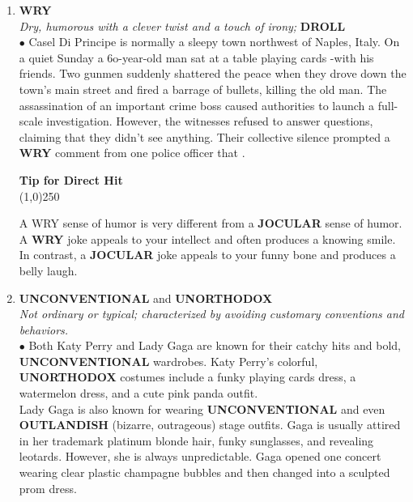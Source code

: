 \documentclass{book}
\begin{document}
\begin{enumerate}
\item \textbf{WRY} \\
\textit{Dry, humorous with a clever twist and a touch of irony;} \textbf{DROLL}\\

$\bullet$ Casel Di Principe is normally a sleepy town northwest of Naples, Italy. On a quiet Sunday a 6o-year-old man sat at a table playing cards -with his friends. Two
gunmen suddenly shattered the peace when they
drove down the town's main street and fired a barrage
of bullets, killing the old man. The assassination of an
important crime boss caused authorities to launch a
full-scale investigation. However, the witnesses refused to answer questions, claiming that they didn't see anything. Their collective silence prompted a \textbf{WRY} comment from one police officer that .\\

\begin{tcolorbox}
\begin{center}
\textbf{Tip for Direct Hit}\\
\line(1,0){250}\\
\end{center}
A WRY sense of humor is very different from a
\textbf{JOCULAR} sense of humor. A \textbf{WRY} joke appeals
to your intellect and often produces a knowing
smile. In contrast, a \textbf{JOCULAR} joke appeals to
your funny bone and produces a belly laugh.
\end{tcolorbox}

\item \textbf{UNCONVENTIONAL} and
\textbf{UNORTHODOX}\\ \textit{Not ordinary or typical; characterized by
avoiding customary conventions and behaviors.}\\

$\bullet$ Both Katy Perry and Lady Gaga are known for their
catchy hits and bold, \textbf{UNCONVENTIONAL}
wardrobes. Katy Perry's colorful, \textbf{UNORTHODOX}
costumes include a funky playing cards dress, a
watermelon dress, and a cute pink panda outfit.\\

Lady Gaga is also known for wearing
\textbf{UNCONVENTIONAL} and even \textbf{OUTLANDISH}
(bizarre, outrageous) stage outfits. Gaga is usually
attired in her trademark platinum blonde hair, funky
sunglasses, and revealing leotards. However, she is
always unpredictable. Gaga opened one concert
wearing clear plastic champagne bubbles and then
changed into a sculpted prom dress.


\end{enumerate}
\end{document}
